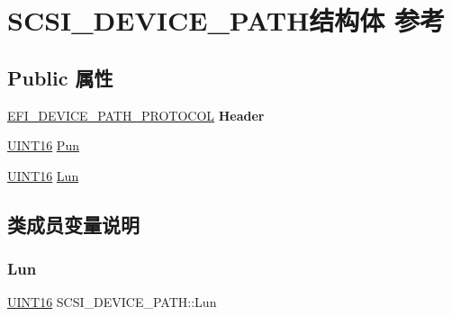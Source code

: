 \hypertarget{struct_s_c_s_i___d_e_v_i_c_e___p_a_t_h}{}\section{S\+C\+S\+I\+\_\+\+D\+E\+V\+I\+C\+E\+\_\+\+P\+A\+T\+H结构体 参考}
\label{struct_s_c_s_i___d_e_v_i_c_e___p_a_t_h}
\subsection*{Public 属性}
\begin{DoxyCompactItemize}
\item 
\mbox{\label{struct_s_c_s_i___d_e_v_i_c_e___p_a_t_h_a447b60e2bdea1ee2b1ce12f1fed1b2e1}} 
\hyperlink{struct_e_f_i___d_e_v_i_c_e___p_a_t_h___p_r_o_t_o_c_o_l}{E\+F\+I\+\_\+\+D\+E\+V\+I\+C\+E\+\_\+\+P\+A\+T\+H\+\_\+\+P\+R\+O\+T\+O\+C\+OL} {\bfseries Header}
\item 
\hyperlink{_processor_bind_8h_a09f1a1fb2293e33483cc8d44aefb1eb1}{U\+I\+N\+T16} \hyperlink{struct_s_c_s_i___d_e_v_i_c_e___p_a_t_h_ab48c334bbbc40d54e023f4acb2e73c08}{Pun}
\item 
\hyperlink{_processor_bind_8h_a09f1a1fb2293e33483cc8d44aefb1eb1}{U\+I\+N\+T16} \hyperlink{struct_s_c_s_i___d_e_v_i_c_e___p_a_t_h_a499ea40d827d53f85712e6849dea3089}{Lun}
\end{DoxyCompactItemize}


\subsection{类成员变量说明}
\mbox{\label{struct_s_c_s_i___d_e_v_i_c_e___p_a_t_h_a499ea40d827d53f85712e6849dea3089}} 
\subsubsection{\texorpdfstring{Lun}{Lun}}
{\footnotesize\ttfamily \hyperlink{_processor_bind_8h_a09f1a1fb2293e33483cc8d44aefb1eb1}{U\+I\+N\+T16} S\+C\+S\+I\+\_\+\+D\+E\+V\+I\+C\+E\+\_\+\+P\+A\+T\+H\+::\+Lun}

